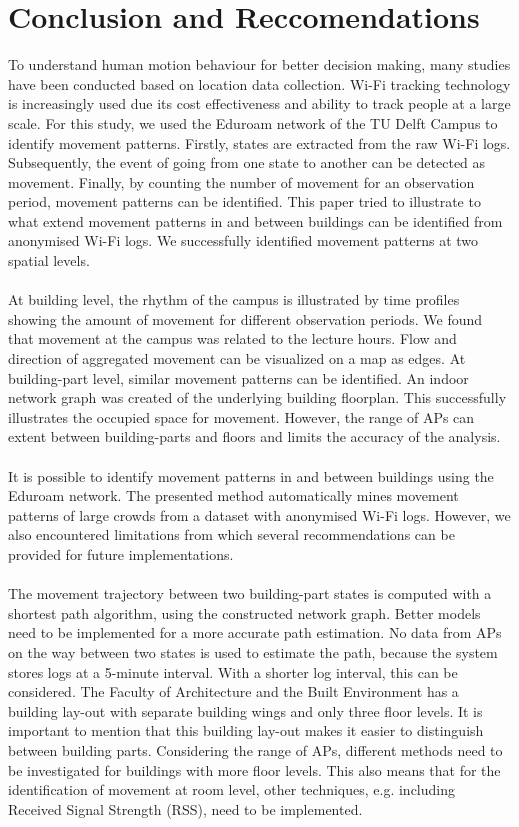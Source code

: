 \section{Conclusion and Reccomendations}\label{4-conclusions}
To understand human motion behaviour for better decision making, many studies have been conducted based on location data collection. Wi-Fi tracking technology is increasingly used due its cost effectiveness and ability to track people at a large scale. For this study, we used the Eduroam network of the TU Delft Campus to identify movement patterns. Firstly, states are extracted from the raw Wi-Fi logs.  Subsequently, the event of going from one state to another can be detected as movement. Finally, by counting the number of movement for an observation period, movement patterns can be identified. This paper tried to illustrate to what extend movement patterns in and between buildings can be identified from anonymised Wi-Fi logs. We successfully identified movement patterns at two spatial levels. 
\\\\
At building level, the rhythm of the campus is illustrated by time profiles showing the amount of movement for different observation periods. We found that movement at the campus was related to the lecture hours. Flow and direction of aggregated movement can be visualized on a map as edges. At building-part level, similar movement patterns can be identified. An indoor network graph was created of the underlying building floorplan. This successfully illustrates the occupied space for movement. However, the range of APs can extent between building-parts and floors and limits the accuracy of the analysis. 
\\\\
It is possible to identify movement patterns in and between buildings using the Eduroam network. The presented method automatically mines movement patterns of large crowds from a dataset with anonymised Wi-Fi logs. However, we also encountered limitations from which several recommendations can be provided for future implementations.
\\\\
The movement trajectory between two building-part states is computed with a shortest path algorithm, using the constructed network graph. Better models need to be implemented for a more accurate path estimation. No data from APs on the way between two states is used to estimate the path, because the system stores logs at a 5-minute interval. With a shorter log interval, this can be considered. The Faculty of Architecture and the Built Environment has a building lay-out with separate building wings and only three floor levels. It is important to mention that this building lay-out makes it easier to distinguish between building parts. Considering the range of APs, different methods need to be investigated for buildings with more floor levels. This also means that for the identification of movement at room level, other techniques, e.g. including Received Signal Strength (RSS), need to be implemented. 
